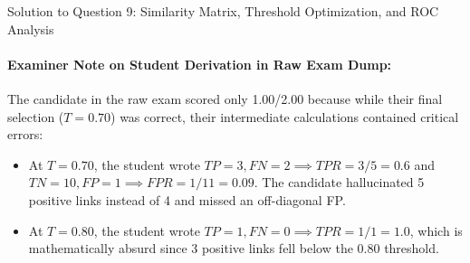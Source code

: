\documentclass[11pt,a4paper]{article}
\begin{document}
\begin{solutionbox}{Solution to Question 9: Similarity Matrix, Threshold Optimization, and ROC Analysis}
\paragraph{Examiner Note on Student Derivation in Raw Exam Dump:}
The candidate in the raw exam scored only 1.00/2.00 because while their final selection ($T=0.70$) was correct, their intermediate calculations contained critical errors:
\begin{itemize}
    \item At $T=0.70$, the student wrote $TP=3, FN=2 \implies TPR = 3/5 = 0.6$ and $TN=10, FP=1 \implies FPR = 1/11 = 0.09$. The candidate hallucinated 5 positive links instead of 4 and missed an off-diagonal FP.
    \item At $T=0.80$, the student wrote $TP=1, FN=0 \implies TPR = 1/1 = 1.0$, which is mathematically absurd since 3 positive links fell below the 0.80 threshold.
\end{itemize}
\end{solutionbox}
\end{document}

